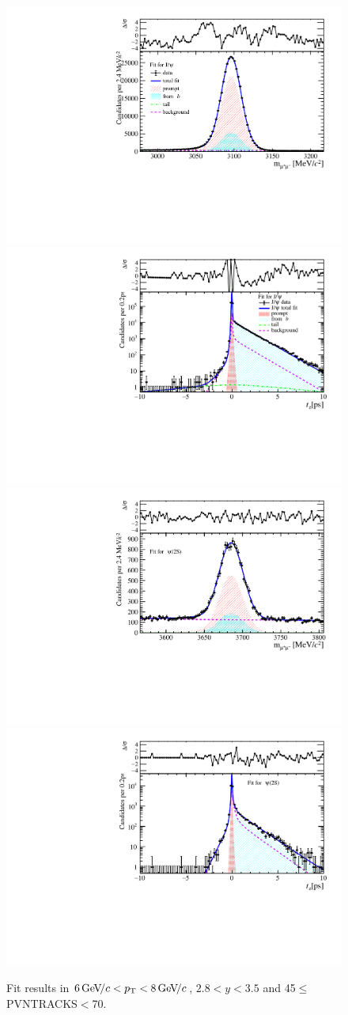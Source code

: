 \begin{figure}[H]
\begin{center}
\includegraphics[width=0.47\linewidth]{pdf/Jpsi/drawmass/n3y2pt4.pdf}
\includegraphics[width=0.47\linewidth]{pdf/Jpsi/2DFit/n3y2pt4.pdf}
\vspace*{-0.5cm}
\includegraphics[width=0.47\linewidth]{pdf/Psi2S/drawmass/n3y2pt4.pdf}
\includegraphics[width=0.47\linewidth]{pdf/Psi2S/2DFit/n3y2pt4.pdf}
\vspace*{-0.5cm}
\end{center}
\caption{Fit results in $6\text{\,Ge\kern -0.1em V\!/}c<p_{\mathrm{T}}<8\text{\,Ge\kern -0.1em V\!/}c$, $2.8<y<3.5$ and 45$\leq$PVNTRACKS$<$70.}
\label{Fitn3y2pt4}
\end{figure}
